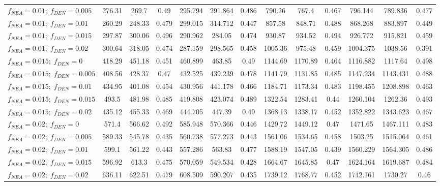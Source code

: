 \begin{tabular}{@{}lcccccccccccc@{}}
$f_{NEA}=0.01 ;\; f_{DEN}=0.005$ & 276.31 & 269.7 & 0.49 & 295.794 & 291.864 & 0.486 & 790.26 & 767.4 & 0.467 & 796.144 & 789.836 & 0.477 \\
$f_{NEA}=0.01 ;\; f_{DEN}=0.01$ & 260.29 & 248.33 & 0.479 & 299.015 & 314.712 & 0.447 & 857.58 & 848.71 & 0.488 & 868.268 & 883.897 & 0.449 \\
$f_{NEA}=0.01 ;\; f_{DEN}=0.015$ & 297.87 & 300.06 & 0.496 & 290.962 & 284.05 & 0.474 & 930.87 & 934.52 & 0.494 & 926.772 & 915.821 & 0.459 \\
$f_{NEA}=0.01 ;\; f_{DEN}=0.02$ & 300.64 & 318.05 & 0.474 & 287.159 & 298.565 & 0.458 & 1005.36 & 975.48 & 0.459 & 1004.375 & 1038.56 & 0.391 \\
$f_{NEA}=0.015 ;\; f_{DEN}=0$ & 418.29 & 451.18 & 0.451 & 460.899 & 463.85 & 0.49 & 1144.69 & 1170.89 & 0.464 & 1116.882 & 1117.64 & 0.498 \\
$f_{NEA}=0.015 ;\; f_{DEN}=0.005$ & 408.56 & 428.37 & 0.47 & 432.525 & 439.239 & 0.478 & 1141.79 & 1131.85 & 0.485 & 1147.234 & 1143.431 & 0.488 \\
$f_{NEA}=0.015 ;\; f_{DEN}=0.01$ & 434.95 & 401.08 & 0.454 & 430.956 & 441.178 & 0.466 & 1184.71 & 1173.34 & 0.483 & 1198.455 & 1208.898 & 0.463 \\
$f_{NEA}=0.015 ;\; f_{DEN}=0.015$ & 493.5 & 481.98 & 0.485 & 419.808 & 423.074 & 0.489 & 1322.54 & 1283.41 & 0.44 & 1260.104 & 1262.36 & 0.493 \\
$f_{NEA}=0.015 ;\; f_{DEN}=0.02$ & 435.12 & 455.33 & 0.469 & 444.705 & 447.39 & 0.49 & 1368.13 & 1338.17 & 0.452 & 1352.822 & 1343.623 & 0.467 \\
$f_{NEA}=0.02 ;\; f_{DEN}=0$ & 571.4 & 566.62 & 0.492 & 585.948 & 570.366 & 0.446 & 1429.72 & 1449.12 & 0.47 & 1471.65 & 1467.111 & 0.483 \\
$f_{NEA}=0.02 ;\; f_{DEN}=0.005$ & 589.33 & 545.78 & 0.435 & 560.738 & 577.273 & 0.443 & 1561.06 & 1534.65 & 0.458 & 1503.25 & 1515.064 & 0.461 \\
$f_{NEA}=0.02 ;\; f_{DEN}=0.01$ & 599.1 & 561.22 & 0.443 & 557.286 & 563.83 & 0.477 & 1588.19 & 1547.05 & 0.439 & 1560.229 & 1564.305 & 0.486 \\
$f_{NEA}=0.02 ;\; f_{DEN}=0.015$ & 596.92 & 613.3 & 0.475 & 570.059 & 549.534 & 0.428 & 1664.67 & 1645.85 & 0.47 & 1624.164 & 1619.687 & 0.484 \\
$f_{NEA}=0.02 ;\; f_{DEN}=0.02$ & 636.11 & 622.51 & 0.479 & 608.509 & 590.207 & 0.435 & 1739.12 & 1768.77 & 0.452 & 1742.161 & 1730.27 & 0.46 \\
\bottomrule
\end{tabular}
